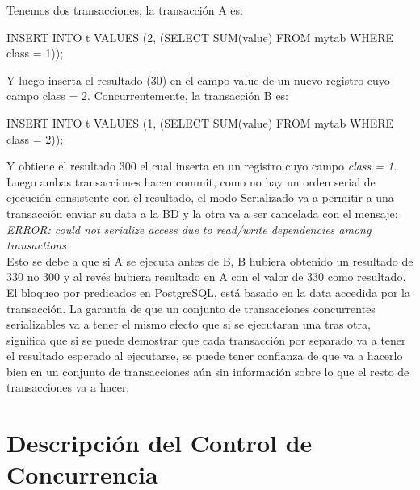Tenemos dos transacciones, la transacción A es:\\

\begin{pyglist}
INSERT INTO t VALUES (2, (SELECT SUM(value) FROM mytab WHERE class = 1));
\end{pyglist}

Y luego inserta el resultado (30) en el campo value  de un nuevo registro cuyo campo class = 2. Concurrentemente, la transacción B es:\\

\begin{pyglist}
INSERT INTO t VALUES (1, (SELECT SUM(value) FROM mytab WHERE class = 2));
\end{pyglist}


Y obtiene el resultado 300 el cual inserta en un registro cuyo campo \textit{class = 1}. Luego ambas transacciones hacen commit, como no hay un orden serial de ejecución consistente con el resultado, el modo Serializado va a permitir a una transacción enviar su data a la BD y la otra va a ser cancelada con el mensaje:\\

\textit{ERROR:  could not serialize access due to read/write dependencies among transactions }\\

Esto se debe a que si A se ejecuta antes de B, B hubiera obtenido un resultado de 330 no 300 y al revés hubiera resultado en A con el valor de 330 como resultado.\\

El bloqueo por predicados en PostgreSQL, está basado en la data accedida por la transacción. La garantía de que un conjunto de transacciones concurrentes serializables va a tener el mismo efecto que si se ejecutaran una tras otra, significa que si se puede demostrar que cada transacción por separado va a tener el resultado esperado al ejecutarse, se puede tener confianza de que va a hacerlo bien en un conjunto de transacciones aún sin información sobre lo que el resto de transacciones va a hacer.\\

\section{Descripción del Control de Concurrencia}

